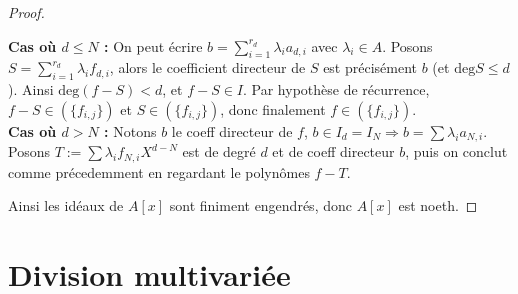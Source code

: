 \begin{proof}
\begin{enumerate}
                    \textbf{Cas où $d \leq N$ :} On peut écrire $b = \sum_{i = 1}^{r_d} \lambda_i a_{d,i}$ avec $\lambda_i \in A$. Posons $S = \sum_{i = 1}^{r_d} \lambda_i f_{d,i}$, alors le coefficient directeur de $S$ est précisément $b$ (et $\mathrm{deg} S \leq d$). Ainsi $\mathrm{deg} (f-S) < d$, et $f - S \in I$. Par hypothèse de récurrence, $f - S \in (\{f_{i,j}\})$ et $S \in (\{f_{i,j}\})$, donc finalement $f \in (\{f_{i,j}\})$. \\
                    \textbf{Cas où $d > N$ :} Notons $b$ le coeff directeur de $f$, $b \in I_d = I_N \Rightarrow b = \sum \lambda_i a_{N,i}$. Posons $T := \sum \lambda_i f_{N,i}X^{d-N}$ est de degré $d$ et de coeff directeur $b$, puis on conclut comme précedemment en regardant le polynômes $f - T$.
                \end{enumerate}
                Ainsi les idéaux de $A[x]$ sont finiment engendrés, donc $A[x]$ est noeth.
            \end{proof}

    \section{Division multivariée}
